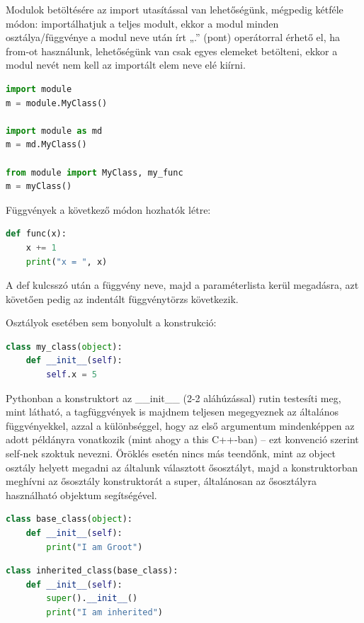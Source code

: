 \documentclass[12pt,a4paper,oneside]{report}             %
\begin{document}
Modulok betöltésére az import utasítással van lehetőségünk, mégpedig kétféle módon: importálhatjuk a teljes modult, ekkor a modul minden osztálya/függvénye a modul neve után írt „.” (pont) operátorral érhető el, ha from-ot használunk, lehetőségünk van csak egyes elemeket betölteni, ekkor a modul nevét nem kell az importált elem neve elé kiírni.

\begin{lstlisting}[language=Python]
import module
m = module.MyClass()

import module as md
m = md.MyClass()

from module import MyClass, my_func
m = myClass()
\end{lstlisting}

Függvények a következő módon hozhatók létre:

\begin{lstlisting}[language=Python]
def func(x):
	x += 1
	print("x = ", x)
\end{lstlisting}

A def kulcsszó után a függvény neve, majd a paraméterlista kerül megadásra, azt követően pedig az indentált függvénytörzs következik.

Osztályok esetében sem bonyolult a konstrukció:

\begin{lstlisting}[language=Python]
class my_class(object):
	def __init__(self):
		self.x = 5
\end{lstlisting}

Pythonban a konstruktort az \_\_init\_\_ (2-2 aláhúzással) rutin testesíti meg, mint látható, a tagfüggvények is majdnem teljesen megegyeznek az általános függvényekkel, azzal a különbséggel, hogy az első argumentum mindenképpen az adott példányra vonatkozik (mint ahogy a this C++-ban) – ezt konvenció szerint self-nek szoktuk nevezni.
Öröklés esetén nincs más teendőnk, mint az object osztály helyett megadni az általunk választott ősosztályt, majd a konstruktorban meghívni az ősosztály konstruktorát a super, általánosan az ősosztályra használható objektum segítségével.

\begin{lstlisting}[language=Python]
class base_class(object):
	def __init__(self):
		print("I am Groot")
\end{lstlisting}

\begin{lstlisting}[language=Python]
class inherited_class(base_class):
	def __init__(self):
		super().__init__()
		print("I am inherited")
\end{lstlisting}
\end{document}
